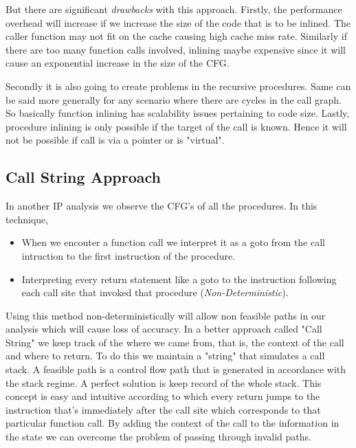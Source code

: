 \documentclass[12pt,oneside]{book}
\begin{document}
But there are significant \textit{drawbacks} with this approach. Firstly, the performance overhead will increase if we increase the size of the code that is to be inlined. The caller function may not fit on the cache causing high cache miss rate. Similarly if there are too many function calls involved, inlining maybe expensive since it will cause an exponential increase in the size of the CFG.

Secondly it is also going to create problems in the recursive procedures. Same can be said more generally for any scenario where there are cycles in the call graph. So basically function inlining has scalability issues pertaining to code size. Lastly, procedure inlining is only possible if the target of the call is known. Hence it will not be possible if call is via a pointer or is "virtual".


\subsection {Call String Approach}
In another IP analysis we observe the CFG's of all the procedures. In this technique,
\begin{itemize}
\item When we encouter a function call we interpret it as a goto from the call intruction to the first instruction of the procedure.
\item Interpreting every return statement like a goto to the instruction following each call site that invoked that procedure (\textit{Non-Deterministic}).
\end{itemize}
Using this method non-deterministically will allow non feasible paths in our analysis which will cause loss of accuracy. In a better approach called "Call String"\cite{callstring} we keep track of the where we came from, that is, the context of the call and where to return. To do this we maintain a "string" that simulates a call stack. A feasible path is a control flow path that is generated in accordance with the stack regime. A perfect solution is keep record of the whole stack. This concept is easy and intuitive according to which every return jumps to the instruction that's immediately after the call site which corresponds to that particular function call. By adding the context of the call to the information in the state we can overcome the problem of passing through invalid paths.\\
\end{document}
